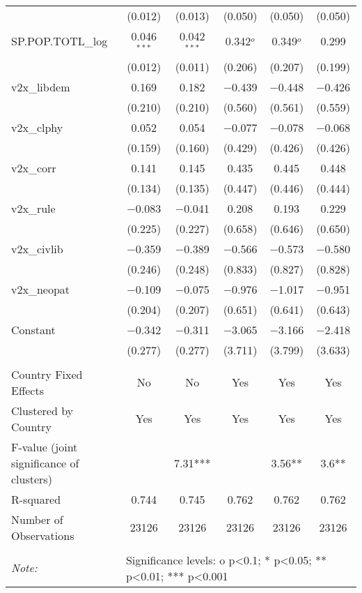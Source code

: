 \begin{tabular}{@{\extracolsep{5pt}}lccccc}
  & (0.012) & (0.013) & (0.050) & (0.050) & (0.050) \\ 
  SP.POP.TOTL\_log & 0.046$^{***}$ & 0.042$^{***}$ & 0.342$^{o}$ & 0.349$^{o}$ & 0.299 \\ 
  & (0.012) & (0.011) & (0.206) & (0.207) & (0.199) \\ 
  v2x\_libdem & 0.169 & 0.182 & $-$0.439 & $-$0.448 & $-$0.426 \\ 
  & (0.210) & (0.210) & (0.560) & (0.561) & (0.559) \\ 
  v2x\_clphy & 0.052 & 0.054 & $-$0.077 & $-$0.078 & $-$0.068 \\ 
  & (0.159) & (0.160) & (0.429) & (0.426) & (0.426) \\ 
  v2x\_corr & 0.141 & 0.145 & 0.435 & 0.445 & 0.448 \\ 
  & (0.134) & (0.135) & (0.447) & (0.446) & (0.444) \\ 
  v2x\_rule & $-$0.083 & $-$0.041 & 0.208 & 0.193 & 0.229 \\ 
  & (0.225) & (0.227) & (0.658) & (0.646) & (0.650) \\ 
  v2x\_civlib & $-$0.359 & $-$0.389 & $-$0.566 & $-$0.573 & $-$0.580 \\ 
  & (0.246) & (0.248) & (0.833) & (0.827) & (0.828) \\ 
  v2x\_neopat & $-$0.109 & $-$0.075 & $-$0.976 & $-$1.017 & $-$0.951 \\ 
  & (0.204) & (0.207) & (0.651) & (0.641) & (0.643) \\ 
  Constant & $-$0.342 & $-$0.311 & $-$3.065 & $-$3.166 & $-$2.418 \\ 
  & (0.277) & (0.277) & (3.711) & (3.799) & (3.633) \\ 
 \hline \\[-1.8ex] 
Country Fixed Effects & No & No & Yes & Yes & Yes \\ 
Clustered by Country & Yes & Yes & Yes & Yes & Yes \\ 
F-value (joint significance of clusters) &  & 7.31*** &  & 3.56** & 3.6** \\ 
R-squared & 0.744 & 0.745 & 0.762 & 0.762 & 0.762 \\ 
Number of Observations & 23126 & 23126 & 23126 & 23126 & 23126 \\ 
\hline 
\hline \\[-1.8ex] 
\textit{Note:}  & \multicolumn{5}{l}{Significance levels: o p<0.1; * p<0.05; ** p<0.01; *** p<0.001} \\ 
\end{tabular} 
